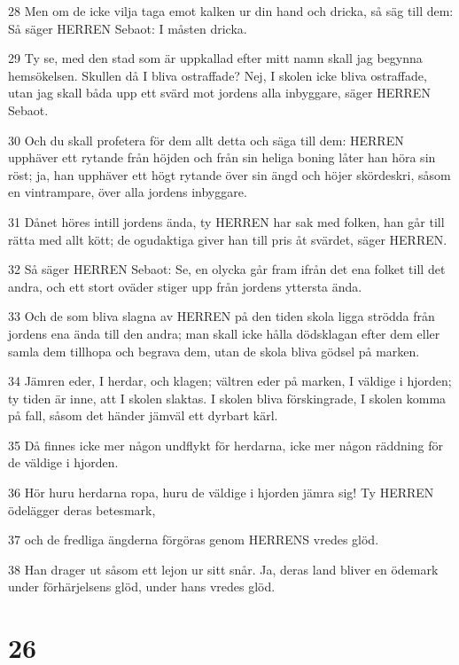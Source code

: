\par 28 Men om de icke vilja taga emot kalken ur din hand och dricka, så säg till dem: Så säger HERREN Sebaot: I måsten dricka.
\par 29 Ty se, med den stad som är uppkallad efter mitt namn skall jag begynna hemsökelsen. Skullen då I bliva ostraffade? Nej, I skolen icke bliva ostraffade, utan jag skall båda upp ett svärd mot jordens alla inbyggare, säger HERREN Sebaot.
\par 30 Och du skall profetera för dem allt detta och säga till dem: HERREN upphäver ett rytande från höjden och från sin heliga boning låter han höra sin röst; ja, han upphäver ett högt rytande över sin ängd och höjer skördeskri, såsom en vintrampare, över alla jordens inbyggare.
\par 31 Dånet höres intill jordens ända, ty HERREN har sak med folken, han går till rätta med allt kött; de ogudaktiga giver han till pris åt svärdet, säger HERREN.
\par 32 Så säger HERREN Sebaot: Se, en olycka går fram ifrån det ena folket till det andra, och ett stort oväder stiger upp från jordens yttersta ända.
\par 33 Och de som bliva slagna av HERREN på den tiden skola ligga strödda från jordens ena ända till den andra; man skall icke hålla dödsklagan efter dem eller samla dem tillhopa och begrava dem, utan de skola bliva gödsel på marken.
\par 34 Jämren eder, I herdar, och klagen; vältren eder på marken, I väldige i hjorden; ty tiden är inne, att I skolen slaktas. I skolen bliva förskingrade, I skolen komma på fall, såsom det händer jämväl ett dyrbart kärl.
\par 35 Då finnes icke mer någon undflykt för herdarna, icke mer någon räddning för de väldige i hjorden.
\par 36 Hör huru herdarna ropa, huru de väldige i hjorden jämra sig! Ty HERREN ödelägger deras betesmark,
\par 37 och de fredliga ängderna förgöras genom HERRENS vredes glöd.
\par 38 Han drager ut såsom ett lejon ur sitt snår. Ja, deras land bliver en ödemark under förhärjelsens glöd, under hans vredes glöd.

\chapter{26}


